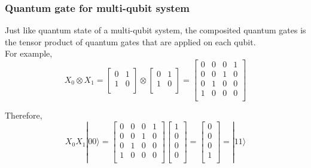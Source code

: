 \subsubsection{Quantum gate for multi-qubit system}

Just like quantum state of a multi-qubit system, the composited quantum gates is the tensor product of quantum gates that are applied on each qubit.  \\For example, 
\begin{equation}
X_0 \otimes X_1 = 
\begin{bmatrix}
0 & 1 \\
1 & 0 \\
\end{bmatrix}
\otimes
 \begin{bmatrix}
0 & 1 \\
1 & 0 \\
\end{bmatrix}
=  \begin{bmatrix}
0 & 0 & 0 & 1 \\
0 & 0 & 1 & 0 \\
0 & 1 & 0 & 0 \\
1 & 0 & 0 & 0 \\
\end{bmatrix}
\end{equation}

Therefore, 
\begin{equation}
 X_0X_1 |00\rangle = 
\begin{bmatrix}
0 & 0 & 0 & 1 \\
0 & 0 & 1 & 0 \\
0 & 1 & 0 & 0 \\
1 & 0 & 0 & 0 \\
\end{bmatrix}
\left[
\begin{array}{c}
1 \\
0 \\
0 \\
0 \\
\end{array}
\right] 
= \left[
\begin{array}{c}
0 \\
0 \\
0 \\
1 \\
\end{array}
\right] 
= |11\rangle
\end{equation}

